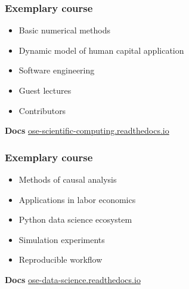 \begin{frame}\frametitle{Exemplary course}

	\vspace{0.3cm}\vspace{0.3cm}

	\begin{itemize}\setlength\itemsep{1em}
\item Basic numerical methods
\item Dynamic model of human capital application
\item Software engineering
\item Guest lectures
\item Contributors
\end{itemize}

\textbf{Docs}\hspace{0.25cm} \url{ose-scientific-computing.readthedocs.io}

\end{frame}
\begin{frame}\frametitle{Exemplary course}

	\vspace{0.3cm}\vspace{0.3cm}

	\begin{itemize}\setlength\itemsep{1em}
\item Methods of causal analysis
\item Applications in labor economics
\item Python data science ecosystem
\item Simulation experiments
\item Reproducible workflow
\end{itemize}

\textbf{Docs}\hspace{0.25cm} \url{ose-data-science.readthedocs.io}

\end{frame}
